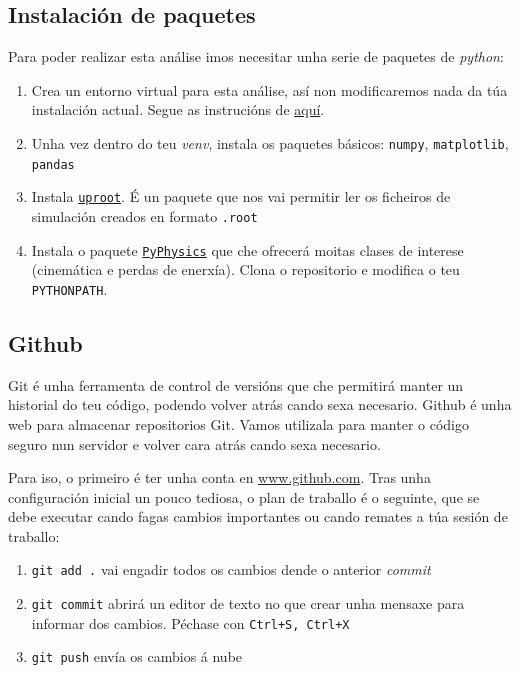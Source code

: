 \documentclass[11pt, a4paper]{article}
\begin{document}
\subsection{Instalación de paquetes}
Para poder realizar esta análise imos necesitar unha serie de paquetes de \textit{python}:
\begin{enumerate}
    \item Crea un entorno virtual para esta análise, así non modificaremos nada da túa instalación actual. Segue as instrucións de \href{https://docs.python.org/3/library/venv.html}{aquí}.
    \item Unha vez dentro do teu \textit{venv}, instala os paquetes básicos: \verb|numpy|, \verb|matplotlib|, \verb|pandas|
    \item Instala \href{https://uproot.readthedocs.io/en/stable/basic.html}{\texttt{uproot}}. É un paquete que nos vai permitir ler os ficheiros de simulación creados en formato \verb|.root|
    \item Instala o paquete \href{https://github.com/loopset/PyPhysics}{\texttt{PyPhysics}} que che ofrecerá moitas clases de interese (cinemática e perdas de enerxía). Clona o repositorio e modifica o teu \verb|PYTHONPATH|.
\end{enumerate}



\subsection{Github}
Git é unha ferramenta de control de versións que che permitirá manter un historial do teu código, podendo volver atrás cando sexa necesario. Github é unha web para almacenar repositorios Git. Vamos utilizala para manter o código seguro nun servidor e volver cara atrás cando sexa necesario.

Para iso, o primeiro é ter unha conta en \url{www.github.com}. Tras unha configuración inicial un pouco tediosa, o plan de traballo é o seguinte, que se debe executar cando fagas cambios importantes ou cando remates a túa sesión de traballo:
\begin{enumerate}
    \item \lstinline|git add .| vai engadir todos os cambios dende o anterior \textit{commit}
    \item \lstinline|git commit| abrirá un editor de texto no que crear unha mensaxe para informar dos cambios. Péchase con \lstinline|Ctrl+S, Ctrl+X|
    \item \lstinline|git push| envía os cambios á nube
\end{enumerate}
\end{document}
